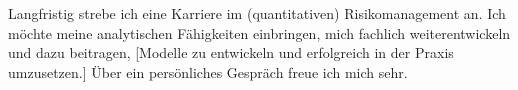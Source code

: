 Langfristig strebe ich eine Karriere im {(quantitativen) Risikomanagement} an. Ich möchte meine analytischen Fähigkeiten einbringen, mich fachlich weiterentwickeln und dazu beitragen, [Modelle zu entwickeln und erfolgreich in der Praxis umzusetzen.] Über ein persönliches Gespräch freue ich mich sehr.
